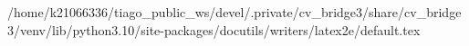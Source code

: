 /home/k21066336/tiago_public_ws/devel/.private/cv_bridge3/share/cv_bridge3/venv/lib/python3.10/site-packages/docutils/writers/latex2e/default.tex